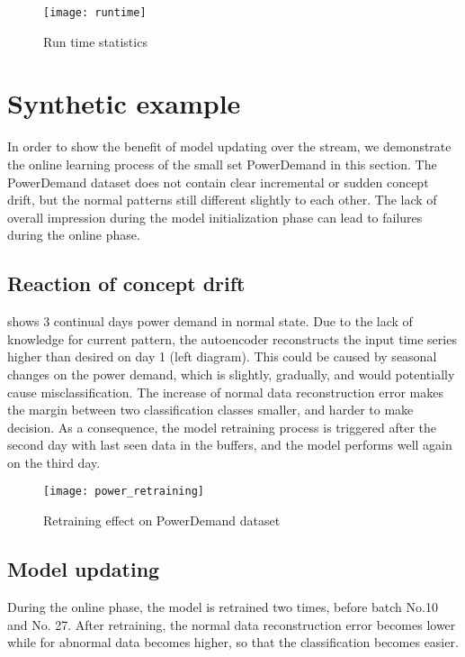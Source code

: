 \begin{figure}[h]
\centering
\texttt{[image: runtime]}
\caption[Run time statistics]{Run time statistics}
\label{fig:runtime}
\end{figure}


\section{Synthetic example}
\label{sec:synthetic}

In order to show the benefit of model updating over the stream, we demonstrate the online learning process of the small set PowerDemand in this section. The PowerDemand dataset does not contain clear incremental or sudden concept drift, but the normal patterns still different slightly to each other. The lack of overall impression during the model initialization phase can lead to failures during the online phase. 

\subsection{Reaction of concept drift}
\label{sec:reaction}

 shows 3 continual days power demand in normal state. Due to the lack of knowledge for current pattern, the autoencoder reconstructs the input time series higher than desired on day 1 (left diagram). This could be caused by seasonal changes on the power demand, which is slightly, gradually, and would potentially cause misclassification. The increase of normal data reconstruction error makes the margin between two classification classes smaller, and harder to make decision. As a consequence, the model retraining process is triggered after the second day with last seen data in the buffers, and the model performs well again on the third day.

\begin{figure}[h]
\centering
\texttt{[image: power\_retraining]}
\caption[Retraining effect on PowerDemand dataset]{Retraining effect on PowerDemand dataset}
\label{fig:power_retraining}
\end{figure}

\subsection{Model updating}
\label{sec:retrainig}

During the online phase, the model is retrained two times, before batch No.10 and No. 27. After retraining, the normal data reconstruction error becomes lower while for abnormal data becomes higher, so that the classification becomes easier.

